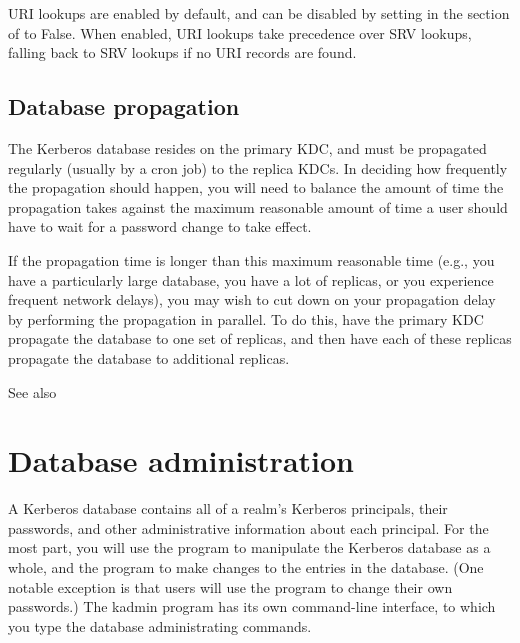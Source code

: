 \documentclass[letterpaper,10pt,english]{sphinxmanual}
\begin{document}
URI lookups are enabled by default, and can be disabled by setting
 in the {\hyperref[\detokenize{admin/conf_files/krb5_conf:libdefaults}]{}} section of
{\hyperref[\detokenize{admin/conf_files/krb5_conf:krb5-conf-5}]{}} to False.  When enabled, URI lookups take
precedence over SRV lookups, falling back to SRV lookups if no URI
records are found.


\section{Database propagation}
\label{\detokenize{admin/realm_config:database-propagation}}\label{\detokenize{admin/realm_config:db-prop}}
The Kerberos database resides on the primary KDC, and must be
propagated regularly (usually by a cron job) to the replica KDCs.  In
deciding how frequently the propagation should happen, you will need
to balance the amount of time the propagation takes against the
maximum reasonable amount of time a user should have to wait for a
password change to take effect.

If the propagation time is longer than this maximum reasonable time
(e.g., you have a particularly large database, you have a lot of
replicas, or you experience frequent network delays), you may wish to
cut down on your propagation delay by performing the propagation in
parallel.  To do this, have the primary KDC propagate the database to
one set of replicas, and then have each of these replicas propagate
the database to additional replicas.

See also {\hyperref[\detokenize{admin/database:incr-db-prop}]{}}


\chapter{Database administration}
\label{\detokenize{admin/database::doc}}\label{\detokenize{admin/database:database-administration}}
A Kerberos database contains all of a realm’s Kerberos principals,
their passwords, and other administrative information about each
principal.  For the most part, you will use the {\hyperref[\detokenize{admin/admin_commands/kdb5_util:kdb5-util-8}]{}}
program to manipulate the Kerberos database as a whole, and the
{\hyperref[\detokenize{admin/admin_commands/kadmin_local:kadmin-1}]{}} program to make changes to the entries in the
database.  (One notable exception is that users will use the
 program to change their own passwords.)  The kadmin
program has its own command-line interface, to which you type the
database administrating commands.
\end{document}
